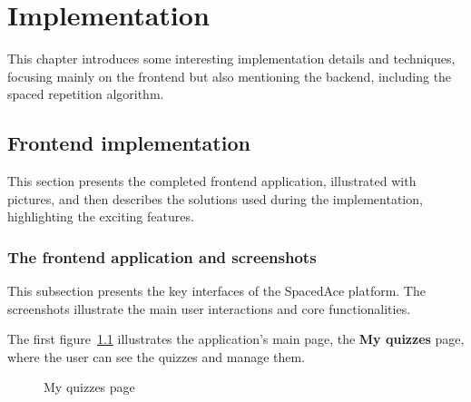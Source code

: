 \chapter{Implementation}\label{ch:implementation}

This chapter introduces some interesting implementation details and techniques, focusing mainly on the frontend but also mentioning the backend, including the spaced repetition algorithm.


\section{Frontend implementation}

This section presents the completed frontend application, illustrated with pictures, and then describes the solutions used during the implementation, highlighting the exciting features.

\subsection{The frontend application and screenshots}

This subsection presents the key interfaces of the SpacedAce platform. The screenshots illustrate the main user interactions and core functionalities.

The first figure~\ref{fig:screenshot-quizzes} illustrates the application's main page, the \textbf{My quizzes} page, where the user can see the quizzes and manage them.

\begin{figure}[H]
	\centering
	\caption{My quizzes page}
	\label{fig:screenshot-quizzes}
\end{figure}

